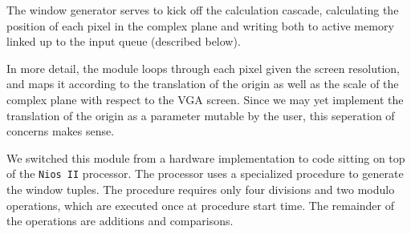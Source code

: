 \documentclass{article}
\begin{document}
The window generator serves to kick off the calculation cascade,
calculating the position of each pixel in the complex plane and
writing both to active memory linked up to the input queue (described
below).

In more detail, the module loops through each pixel given the screen
resolution, and maps it according to the translation of the origin as
well as the scale of the complex plane with respect to the VGA
screen. Since we may yet implement the translation of the origin as a
parameter mutable by the user, this seperation of concerns makes
sense.

We switched this module from a hardware implementation to code sitting
on top of the \verb!Nios II! processor. The processor uses a
specialized procedure to generate the window tuples. The procedure
requires only four divisions and two modulo operations, which are
executed once at procedure start time. The remainder of the operations
are additions and comparisons.
\end{document}
